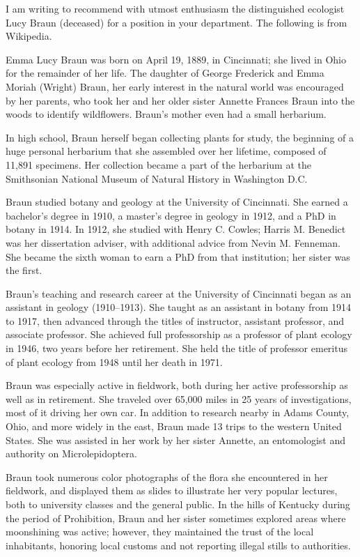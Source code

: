 \documentclass[12pt]{hoflet}
\begin{document}
I am writing to recommend with utmost enthusiasm the distinguished ecologist Lucy Braun (deceased) for a position in your department. The following is from Wikipedia.

Emma Lucy Braun was born on April 19, 1889, in Cincinnati; she lived in Ohio for the remainder of her life. The daughter of George Frederick and Emma Moriah (Wright) Braun, her early interest in the natural world was encouraged by her parents, who took her and her older sister Annette Frances Braun into the woods to identify wildflowers. Braun's mother even had a small herbarium. 

In high school, Braun herself began collecting plants for study, the beginning of a huge personal herbarium that she assembled over her lifetime, composed of 11,891 specimens. Her collection became a part of the herbarium at the Smithsonian National Museum of Natural History in Washington D.C.

Braun studied botany and geology at the University of Cincinnati. She earned a bachelor's degree in 1910, a master's degree in geology in 1912, and a PhD in botany in 1914. In 1912, she studied with Henry C. Cowles; Harris M. Benedict was her dissertation adviser, with additional advice from Nevin M. Fenneman. She became the sixth woman to earn a PhD from that institution; her sister was the first. 

Braun's teaching and research career at the University of Cincinnati began as an assistant in geology (1910–1913). She taught as an assistant in botany from 1914 to 1917, then advanced through the titles of instructor, assistant professor, and associate professor. She achieved full professorship as a professor of plant ecology in 1946, two years before her retirement. She held the title of professor emeritus of plant ecology from 1948 until her death in 1971.

Braun was especially active in fieldwork, both during her active professorship as well as in retirement. She traveled over 65,000 miles in 25 years of investigations, most of it driving her own car. In addition to research nearby in Adams County, Ohio, and more widely in the east, Braun made 13 trips to the western United States. She was assisted in her work by her sister Annette, an entomologist and authority on Microlepidoptera.

Braun took numerous color photographs of the flora she encountered in her fieldwork, and displayed them as slides to illustrate her very popular lectures, both to university classes and the general public. In the hills of Kentucky during the period of Prohibition, Braun and her sister sometimes explored areas where moonshining was active; however, they maintained the trust of the local inhabitants, honoring local customs and not reporting illegal stills to authorities.
\end{document}
